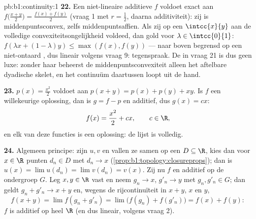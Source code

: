 \begin{solution}{pb:b1:continuity:1}
\textbf{22.} Een niet-lineaire additieve $f$ voldoet exact aan
$f\bigl(\frac{x+y}{2}\bigr) = \frac{f(x) + f(y)}{2}$ (vraag 1 met $r
= \frac12$, daarna additiviteit): zij is middenpuntsconvex, zelfs
middenpuntsaffien. Als zij op een  $\intcc{x}{y}$ aan de
volledige convexiteitsongelijkheid voldeed, dan gold voor $\lambda
\in \intcc{0}{1}$: $f(\lambda x + (1-\lambda)y) \leq \max(f(x),
f(y))$ --- naar boven begrensd op een niet-ontaard , dus
lineair volgens vraag 9: tegenspraak. De  in vraag 21 is
dus geen luxe: zonder haar beheerst de middenpuntsconvexiteit alleen
het aftelbare dyadische skelet, en het continuüm daartussen loopt
uit de hand.

\textbf{23.} $p(x) = \frac{x^2}{2}$ voldoet aan $p(x+y) = p(x) +
p(y) + xy$. Is $f$ een willekeurige  oplossing, dan is $g =
f - p$  en additief, dus $g(x) = cx$:
\[
f(x) = \frac{x^2}{2} + cx , \qquad c \in \R ,
\]
en elk van deze functies is een oplossing: de lijst is volledig.

\textbf{24.} Algemeen principe: zijn $u, v$  en vallen ze
samen op een  $D \subseteq \R$, kies dan voor $x \in \R$
punten $d_n \in D$ met $d_n \to x$
(\cref{prop:b1:topology:closureprops}); dan is $u(x) = \lim u(d_n) =
\lim v(d_n) = v(x)$. Zij nu $f$  en additief op de 
ondergroep $G$. Leg $x, y \in \R$ vast en neem $g_n \to x$, $g'_n
\to y$ met $g_n, g'_n \in G$; dan geldt $g_n + g'_n \to x + y$ en,
wegens de rijcontinuïteit in $x + y$, $x$ en $y$,
\[
f(x + y) = \lim f(g_n + g'_n) = \lim\bigl(f(g_n) +
f(g'_n)\bigr) = f(x) + f(y) :
\]
$f$ is additief op heel $\R$ (en dus lineair, volgens vraag 2).


\end{solution}
